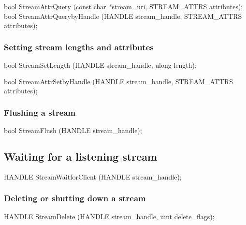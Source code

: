 \begin{paldef}
bool StreamAttrQuery (const char *stream_uri,
                      STREAM_ATTRS attributes);
bool StreamAttrQuerybyHandle (HANDLE stream_handle,
                              STREAM_ATTRS attributes);
\end{paldef}



\subsubsection*{Setting stream lengths and attributes}


\begin{paldef}
bool StreamSetLength (HANDLE stream_handle,
                      ulong length);
\end{paldef}


\begin{paldef}
bool StreamAttrSetbyHandle (HANDLE stream_handle,
                            STREAM_ATTRS attributes);
\end{paldef}




\subsubsection*{Flushing a stream}


\begin{paldef}
bool StreamFlush (HANDLE stream_handle);
\end{paldef}


\subsection*{Waiting for a listening stream}


\begin{paldef}
HANDLE StreamWaitforClient (HANDLE stream_handle);
\end{paldef} 


\subsubsection*{Deleting or shutting down a stream}


\begin{paldef}
HANDLE StreamDelete (HANDLE stream_handle,
                     uint delete_flags);
\end{paldef}